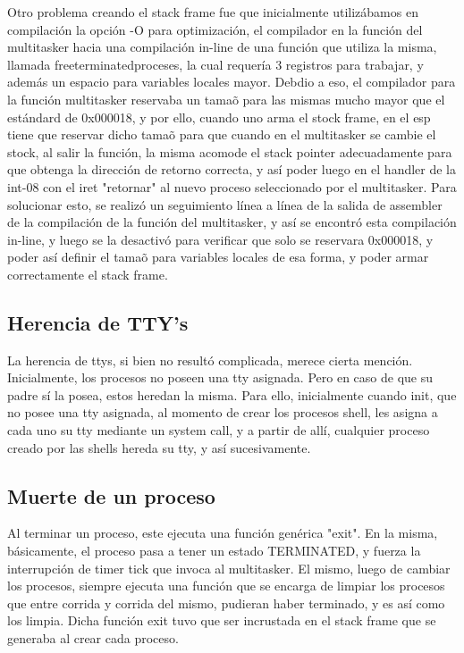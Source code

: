 \documentclass[10pt,a4paper]{article}
\begin{document}
		Otro problema creando el stack frame fue que inicialmente utiliz\'abamos en compilaci\'on la opci\'on -O para optimizaci\'on, el compilador en la funci\'on del multitasker hacia una compilaci\'on in-line de una funci\'on que utiliza la misma, llamada freeterminatedproceses, la cual requer\'ia 3 registros para trabajar, y adem\'as un espacio para variables locales mayor. Debdio a eso, el compilador para la funci\'on multitasker reservaba un tama\~o para las mismas mucho mayor que el est\'andard de 0x000018, y por ello, cuando uno arma el stock frame, en el esp tiene que reservar dicho tama\~o para que cuando en el multitasker se cambie el stock, al salir la funci\'on, la misma acomode el stack pointer adecuadamente para que obtenga la direcci\'on de retorno correcta, y as\'i poder luego en el handler de la int-08 con el iret "retornar" al nuevo proceso seleccionado por el multitasker. Para solucionar esto, se realiz\'o un seguimiento l\'inea a l\'inea de la salida de assembler de la compilaci\'on de la funci\'on del multitasker, y as\'i se encontr\'o esta compilaci\'on in-line, y luego se la desactiv\'o para verificar que solo se reservara 0x000018, y poder as\'i definir el tama\~o para variables locales de esa forma, y poder armar correctamente el stack frame.
	\subsection{Herencia de TTY's}
		La herencia de ttys, si bien no result\'o complicada, merece cierta menci\'on. Inicialmente, los procesos no poseen una tty asignada. Pero en caso de que su padre s\'i la posea, estos heredan la misma. Para ello, inicialmente cuando init, que no posee una tty asignada, al momento de crear los procesos shell, les asigna a cada uno su tty mediante un system call, y a partir de all\'i, cualquier proceso creado por las shells hereda su tty, y as\'i sucesivamente.
	\subsection{Muerte de un proceso}
	Al terminar un proceso, este ejecuta una funci\'on gen\'erica "exit". En la misma, b\'asicamente, el proceso pasa a tener un estado TERMINATED, y fuerza la interrupci\'on de timer tick que invoca al multitasker. El mismo, luego de cambiar los procesos, siempre ejecuta una funci\'on que se encarga de limpiar los procesos que entre corrida y corrida del mismo, pudieran haber terminado, y es as\'i como los limpia.
	Dicha funci\'on exit tuvo que ser incrustada en el stack frame que se generaba al crear cada proceso.
\end{document}
